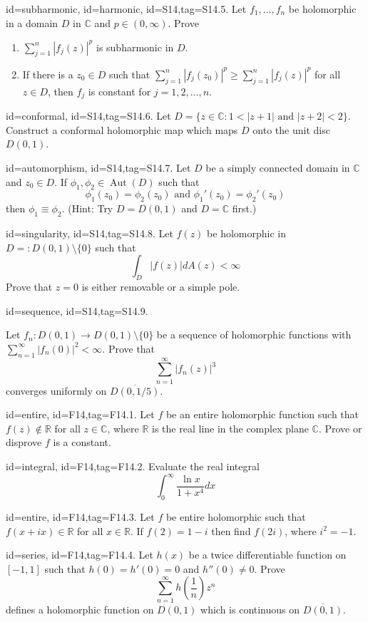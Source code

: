 \documentclass[12pt,letterpaper]{article}
\DeclareMathOperator{\Aut}{Aut}
\begin{document}
{\item[id=subharmonic, id=harmonic, id=S14,tag=S14.5.]
Let $f_1,\ldots, f_n$ be holomorphic in a domain $D$ in $\mathbb{C}$ and $p \in (0,\infty)$. Prove
\begin{enumerate}[label=(\alph*)]\onlyitems
\item $\sum_{j=1}^{n} | f_j(z) |^p$ is subharmonic in $D$.
\item If there is a $z_0 \in D$ such that $\sum_{j=1}^{n} | f_j(z_0) |^p \ge \sum_{j=1}^{n} | f_j(z) |^p$ for all $z \in D$, then $f_j$ is constant for $j = 1,2,\ldots, n$.
\end{enumerate}

\item[id=conformal, id=S14,tag=S14.6.]
Let $D = \{z \in \mathbb{C} \colon 1 < | z + 1 | \text{ and } | z + 2 | < 2 \}$. Construct a conformal holomorphic map which maps $D$ onto the unit disc $D(0,1)$.

\item[id=automorphism, id=S14,tag=S14.7.]
Let $D$ be a simply connected domain in $\mathbb{C}$ and $z_0 \in D$. If $\phi_1, \phi_2 \in \Aut(D)$ such that
\[
	\phi_1(z_0) = \phi_2(z_0) \text{ and } \phi_1'(z_0) = \phi_2'(z_0)
\]
then $\phi_1 \equiv \phi_2$. (Hint: Try $D = D(0,1)$ and $D = \mathbb{C}$ first.)

\item[id=singularity, id=S14,tag=S14.8.]
Let $f(z)$ be holomorphic in $D =: D(0,1) \setminus \{0\}$ such that
\[
	\int_{D} | f(z) | dA(z) < \infty
\]
Prove that $z = 0$ is either removable or a simple pole.

\item[id=sequence, id=S14,tag=S14.9.]

Let $f_n : D(0,1) \rightarrow D(0,1) \setminus \{0\}$ be a sequence of holomorphic functions with $\sum_{n=1}^{\infty} | f_n(0) |^2 < \infty$. Prove that
\[
	\sum_{n=1}^{\infty} | f_n(z) |^3
\]
converges uniformly on $\overline{D(0,1/5)}.$


\item[id=entire, id=F14,tag=F14.1.]
Let $f$ be an entire holomorphic function such that $f(z) \notin \mathbb{R}$ for all $z \in \mathbb{C}$, where $\mathbb{R}$ is the real line in the complex plane $\mathbb{C}$. Prove or disprove $f$ is a constant.
\item[id=integral, id=F14,tag=F14.2.]
Evaluate the real integral
\[
	\int_{0}^{\infty} \frac{\ln x}{1 + x^4} dx
\]
\item[id=entire, id=F14,tag=F14.3.]
Let $f$ be entire holomorphic such that $f(x+ix) \in \mathbb{R}$ for all $x \in \mathbb{R}$. If $f(2) = 1 - i$ then find $f(2i)$, where $i^2 = -1$.
\item[id=series, id=F14,tag=F14.4.]
Let $h(x)$ be a twice differentiable function on $[-1,1]$ such that $h(0) = h'(0) = 0$ and $h''(0) \ne 0$. Prove
\[
	\sum_{n=1}^{\infty} h\left(\frac{1}{n}\right) z^n
\]
defines a holomorphic function on $D(0,1)$ which is continuous on $\overline{D(0,1)}.$

}
\end{document}
